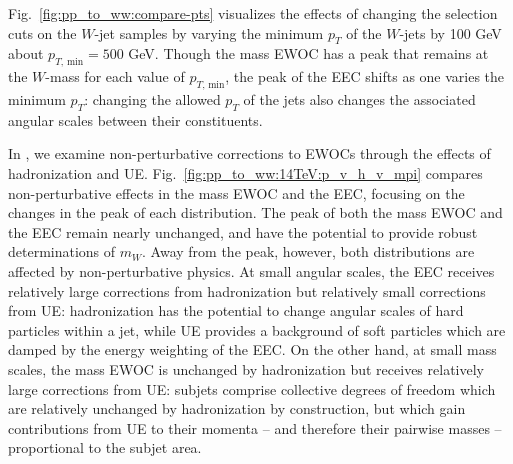 Fig.~\ref{fig:pp_to_ww:compare-pts} visualizes the effects of changing the selection cuts on the \(W\)-jet samples by varying the minimum \(p_T\) of the \(W\)-jets by 100 GeV about \(p_{T,\,\text{min}} = 500\) GeV.
%
Though the mass EWOC has a peak that remains at the \(W\)-mass for each value of \(p_{T,\,\text{min}}\), the peak of the EEC shifts as one varies the minimum \(p_T\):
%
changing the allowed \(p_T\) of the jets also changes the associated angular scales between their constituents.


In , we examine non-perturbative corrections to EWOCs through the effects of hadronization and UE.
%
Fig.~\ref{fig:pp_to_ww:14TeV:p_v_h_v_mpi} compares non-perturbative effects in the mass EWOC and the EEC, focusing on the changes in the peak of each distribution.
%
The peak of both the mass EWOC and the EEC remain nearly unchanged, and have the potential to provide robust determinations of \(m_W\).
%
Away from the peak, however, both distributions are affected by non-perturbative physics.
%
At small angular scales, the EEC receives relatively large corrections from hadronization but relatively small corrections from UE:
%
hadronization has the potential to change angular scales of hard particles within a jet, while UE provides a background of soft particles which are damped by the energy weighting of the EEC.
%
On the other hand, at small mass scales, the mass EWOC is unchanged by hadronization but receives relatively large corrections from UE:
%
subjets comprise collective degrees of freedom which are relatively unchanged by hadronization by construction, but which gain contributions from UE to their momenta -- and therefore their pairwise masses -- proportional to the subjet area.

